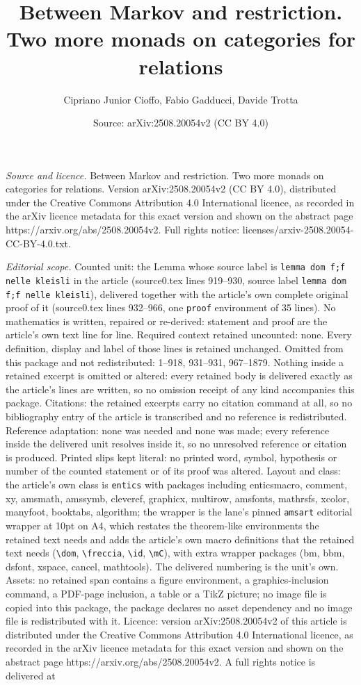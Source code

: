 \documentclass[10pt,a4paper]{amsart}
\title[Between Markov and restriction. Two more monads on categorie]{Between Markov and restriction. Two more monads on categories for relations}
\author{Cipriano Junior Cioffo, Fabio Gadducci, Davide Trotta}
\date{Source: arXiv:2508.20054v2 (CC BY 4.0)}
\begin{document}
\maketitle

\noindent\emph{Source and licence.} Between Markov and restriction. Two more monads on categories for relations. Version arXiv:2508.20054v2 (CC BY 4.0), distributed under the Creative Commons Attribution 4.0 International licence, as recorded in the arXiv licence metadata for this exact version and shown on the abstract page https://arxiv.org/abs/2508.20054v2. Full rights notice: licenses/arxiv-2508.20054-CC-BY-4.0.txt.\par\smallskip

\noindent\textit{Editorial scope.} Counted unit: the Lemma whose source label is \texttt{lemma dom f;f nelle kleisli} in the article (source0.tex lines 919--930, source label \texttt{lemma dom f;f nelle kleisli}), delivered together with the article's own complete original proof of it (source0.tex lines 932--966, one \texttt{proof} environment of 35 lines). No mathematics is written, repaired or re-derived: statement and proof are the article's own text line for line. Required context retained uncounted: none. Every definition, display and label of those lines is retained unchanged. Omitted from this package and not redistributed: 1--918, 931--931, 967--1879. Nothing inside a retained excerpt is omitted or altered: every retained body is delivered exactly as the article's lines are written, so no omission receipt of any kind accompanies this package. Citations: the retained excerpts carry no citation command at all, so no bibliography entry of the article is transcribed and no reference is redistributed. Reference adaptation: none was needed and none was made; every reference inside the delivered unit resolves inside it, so no unresolved reference or citation is produced. Printed slips kept literal: no printed word, symbol, hypothesis or number of the counted statement or of its proof was altered. Layout and class: the article's own class is \texttt{entics} with packages including enticsmacro, comment, xy, amsmath, amssymb, cleveref, graphicx, multirow, amsfonts, mathrsfs, xcolor, manyfoot, booktabs, algorithm; the wrapper is the lane's pinned \texttt{amsart} editorial wrapper at 10pt on A4, which restates the theorem-like environments the retained text needs and adds the article's own macro definitions that the retained text needs (\texttt{\textbackslash dom}, \texttt{\textbackslash freccia}, \texttt{\textbackslash id}, \texttt{\textbackslash mC}), with extra wrapper packages (bm, bbm, dsfont, xspace, cancel, mathtools). The delivered numbering is the unit's own. Assets: no retained span contains a figure environment, a graphics-inclusion command, a PDF-page inclusion, a table or a TikZ picture; no image file is copied into this package, the package declares no asset dependency and no image file is redistributed with it. Licence: version arXiv:2508.20054v2 of this article is distributed under the Creative Commons Attribution 4.0 International licence, as recorded in the arXiv licence metadata for this exact version and shown on the abstract page https://arxiv.org/abs/2508.20054v2. A full rights notice is delivered at 
\end{document}
